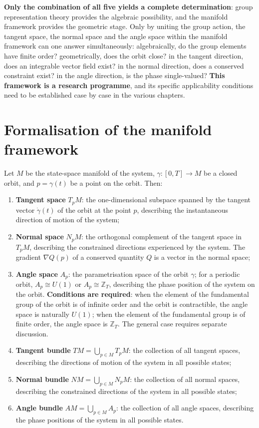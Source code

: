 \textbf{Only the combination of all five yields a complete determination}: group representation theory provides the algebraic possibility, and the manifold framework provides the geometric stage. Only by uniting the group action, the tangent space, the normal space and the angle space within the manifold framework can one answer simultaneously: algebraically, do the group elements have finite order? geometrically, does the orbit close? in the tangent direction, does an integrable vector field exist? in the normal direction, does a conserved constraint exist? in the angle direction, is the phase single-valued? \textbf{This framework is a research programme}, and its specific applicability conditions need to be established case by case in the various chapters.

\section*{Formalisation of the manifold framework}

Let $M$ be the state-space manifold of the system, $\gamma: [0,T] \to M$ be a closed orbit, and $p = \gamma(t)$ be a point on the orbit. Then:

\begin{enumerate}[leftmargin=4em, label={(\arabic*)}]
    \item \textbf{Tangent space} $T_p M$: the one-dimensional subspace spanned by the tangent vector $\dot{\gamma}(t)$ of the orbit at the point $p$, describing the instantaneous direction of motion of the system;
    \item \textbf{Normal space} $N_p M$: the orthogonal complement of the tangent space in $T_p M$, describing the constrained directions experienced by the system. The gradient $\nabla Q(p)$ of a conserved quantity $Q$ is a vector in the normal space;
    \item \textbf{Angle space} $A_p$: the parametrisation space of the orbit $\gamma$; for a periodic orbit, $A_p \cong U(1)$ or $A_p \cong \mathbb{Z}_T$, describing the phase position of the system on the orbit. \textbf{Conditions are required}: when the element of the fundamental group of the orbit is of infinite order and the orbit is contractible, the angle space is naturally $U(1)$; when the element of the fundamental group is of finite order, the angle space is $\mathbb{Z}_T$. The general case requires separate discussion.
    \item \textbf{Tangent bundle} $TM = \bigcup_{p \in M} T_p M$: the collection of all tangent spaces, describing the directions of motion of the system in all possible states;
    \item \textbf{Normal bundle} $NM = \bigcup_{p \in M} N_p M$: the collection of all normal spaces, describing the constrained directions of the system in all possible states;
    \item \textbf{Angle bundle} $AM = \bigcup_{p \in M} A_p$: the collection of all angle spaces, describing the phase positions of the system in all possible states.
\end{enumerate}

